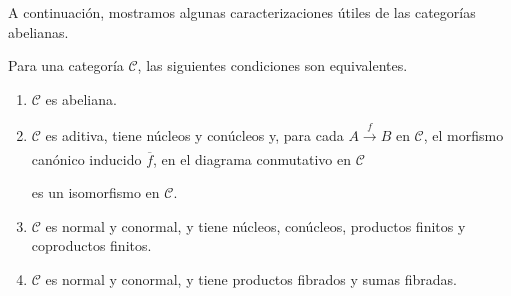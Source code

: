\documentclass[tesis]{subfiles}
\begin{document}
A continuación, mostramos algunas caracterizaciones útiles de las categorías abelianas.

\begin{Teo}\label{Mendoza-1.10.1}
    Para una categoría $\mathscr{C}$, las siguientes condiciones son equivalentes.

    \begin{enumerate}[label=(\alph*)]
    
        \item $\mathscr{C}$ es abeliana.

        \item $\mathscr{C}$ es aditiva, tiene núcleos y conúcleos y, para cada $A\xrightarrow[]{f} B$ en $\mathscr{C}$, el morfismo canónico inducido $\overline{f}$, en el diagrama conmutativo en $\mathscr{C}$
            \begin{center}
            \end{center}
            es un isomorfismo en $\mathscr{C}$.

        \item $\mathscr{C}$ es normal y conormal, y tiene núcleos, conúcleos, productos finitos y coproductos finitos.

        \item $\mathscr{C}$ es normal y conormal, y tiene productos fibrados y sumas fibradas.
    \end{enumerate}
\end{Teo}
\end{document}
